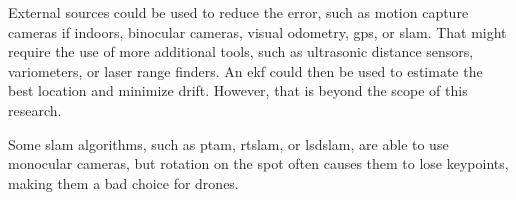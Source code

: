   External sources could be used to reduce the error, such as motion capture cameras if indoors, binocular cameras, visual odometry, \gls{gps}, or \gls{slam}.
  That might require the use of more additional tools, such as ultrasonic distance sensors, variometers, or laser range finders.
  An \gls{ekf} could then be used to estimate the best location and minimize drift.
  However, that is beyond the scope of this research.

  Some \gls{slam} algorithms, such as \gls{ptam}, \gls{rtslam}, or \gls{lsdslam}, are able to use monocular cameras, but rotation on the spot often causes them to lose keypoints, making them a bad choice for drones.

% 

